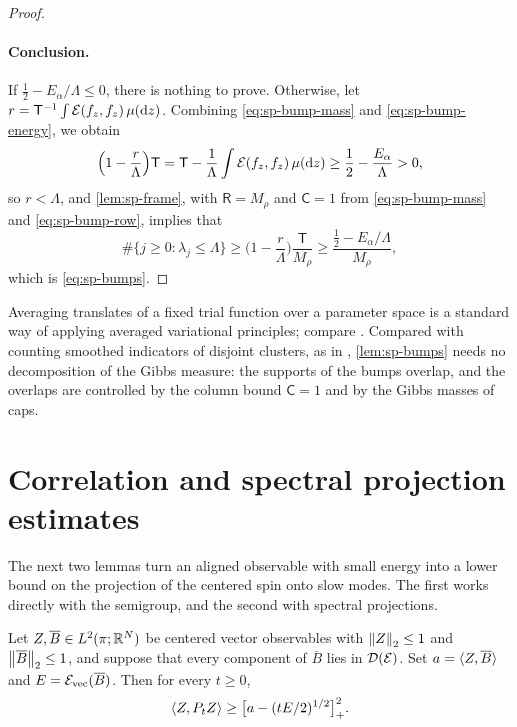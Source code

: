 \begin{proof}
\paragraph{Conclusion.} If $\frac12-E_\alpha/\Lambda\le0$, there is nothing to prove. Otherwise, let $r=\mathsf T^{-1}\int\mathcal E(f_z,f_z)\,\mu(\mathrm dz)$. Combining \eqref{eq:sp-bump-mass} and \eqref{eq:sp-bump-energy}, we obtain
\[
\Big(1-\frac r\Lambda\Big)\mathsf T=\mathsf T-\frac1\Lambda\int\mathcal E(f_z,f_z)\,\mu(\mathrm dz)\ge\frac12-\frac{E_\alpha}\Lambda>0,
\]
so $r<\Lambda$, and \cref{lem:sp-frame}, with $\mathsf R=M_\rho$ and $\mathsf C=1$ from \eqref{eq:sp-bump-mass} and \eqref{eq:sp-bump-row}, implies that
\[
\#\{j\ge0:\lambda_j\le\Lambda\}\ge\Big(1-\frac r\Lambda\Big)\frac{\mathsf T}{M_\rho}\ge\frac{\frac12-E_\alpha/\Lambda}{M_\rho},
\]
which is \eqref{eq:sp-bumps}.
\end{proof}

Averaging translates of a fixed trial function over a parameter space is a standard way of applying averaged variational principles; compare \cite[Section~4]{ElSoufiHarrellIliasStubbe2017}.
Compared with counting smoothed indicators of disjoint clusters, as in \cite[proof of Corollary~2.8]{ElAlaouiMontanariSellke2025}, \cref{lem:sp-bumps} needs no decomposition of the Gibbs measure: the supports of the bumps overlap, and the overlaps are controlled by the column bound $\mathsf C=1$ and by the Gibbs masses of caps.

\section{Correlation and spectral projection estimates}\label{sec:sp-correlation}

The next two lemmas turn an aligned observable with small energy into a lower bound on the projection of the centered spin onto slow modes. The first works directly with the semigroup, and the second with spectral projections.

\begin{lemma}\label{lem:sp-correlation}
Let $Z,\overline B\in L^2(\pi;\mathbb R^N)$ be centered vector observables with $\left\lVert Z\right\rVert_2\le1$ and $\left\lVert\overline B\right\rVert_2\le1$, and suppose that every component of $\overline B$ lies in $\mathcal D(\mathcal E)$. Set $a=\langle Z,\overline B\rangle$ and $E=\mathcal E_{\rm vec}(\overline B)$. Then for every $t\ge0$,
\[
\langle Z,P_tZ\rangle\ge\big[a-(tE/2)^{1/2}\big]_+^2.
\]
\end{lemma}

